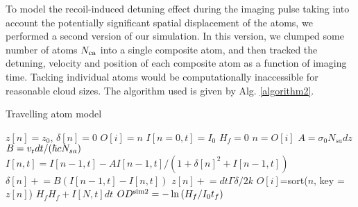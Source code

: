 To model the recoil-induced detuning effect during the imaging pulse taking into account the potentially significant spatial displacement of the atoms, we performed a second version of our simulation. In this version, we clumped some number of atoms $N_{\rm{ca}}$ into a single composite atom, and then tracked the detuning, velocity and position of each composite atom as a function of imaging time. Tacking individual atoms would be computationally inaccessible for reasonable cloud sizes. The algorithm used is given by Alg. \ref{algorithm2}.

%
\begin{algorithm}
\caption{Travelling atom model}
\label{algorithm2}
\begin{algorithmic}
\STATE $z[n]=z_0$, $\delta[n]=0$ 
\STATE $O[i]=n$ 
\STATE $I[n=0,t]=I_0$ 
\STATE $H_f=0$ 
\STATE $n=O[i]$ 
 \STATE $A=\sigma_0 N_{sa} dz$ 
 \STATE $B=v_{\rm{r}} dt/(\hbar c  N_{sa})$  
\STATE $I[n,t]=I[n-1,t] - A I[n-1,t]/(1+\delta[n]^2+I[n-1,t])$  
\STATE $\delta[n]\mathrel{+}=B\left(I[n-1,t]-I[n,t]\right)$  
\STATE $z[n]\mathrel{+}=dt\Gamma\delta/2k$ 
\ENDFOR
\STATE $O[i]$=sort($n$, key =$z[n]$) 
\STATE $H_f H_f+ I[N,t]dt$ 
\ENDFOR
\STATE $OD^{\rm{sim2}}=-\ln{(H_f/I_0t_f)}$
\end{algorithmic}
\end{algorithm}

